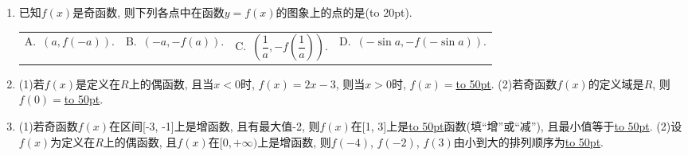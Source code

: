 \documentclass[10pt,a4paper]{article}
\newcommand{\blank}[1]{\underline{\hbox to #1pt{}}}
\newcommand{\bracket}[1]{(\hbox to #1pt{})}
\newcommand{\fourch}[4]{\par\begin{tabular}{p{.23\textwidth}p{.23\textwidth}p{.23\textwidth}p{.23\textwidth}}
A.~#1 &B.~#2& C.~#3& D.~#4
\end{tabular}}
\begin{document}
\begin{enumerate}[1.]
\fourch{是奇函数, 但不是偶函数}{是偶函数, 但不是奇函数}{既是奇函数, 又是偶函数}{既不是奇函数, 也不是偶函数}
\item 已知$f(x)$是奇函数, 则下列各点中在函数$y=f(x)$的图象上的点的是\bracket{20}.
\fourch{$(a,f(-a)).$}{$(-a,-f(a)).$}{$(\dfrac 1a,-f(\dfrac 1a)).$}{$(-\sin a,-f(-\sin a)).$}
\item (1)若$f(x)$是定义在$R$上的偶函数, 且当$x<0$时, $f(x)=2x-3$, 则当$x>0$时, $f(x)=$\blank{50}.
(2)若奇函数$f(x)$的定义域是$R$, 则$f(0)=$\blank{50}.
\item (1)若奇函数$f(x)$在区间[-3, -1]上是增函数, 且有最大值-2, 则$f(x)$在[1, 3]上是\blank{50}函数(填``增''或``减''), 且最小值等于\blank{50}.
(2)设$f(x)$为定义在$R$上的偶函数, 且$f(x)$在$[ 0,+\infty)$上是增函数, 则$f(-4)$, $f(-2)$, $f(3)$由小到大的排列顺序为\blank{50}.


\end{enumerate}
\end{document}

